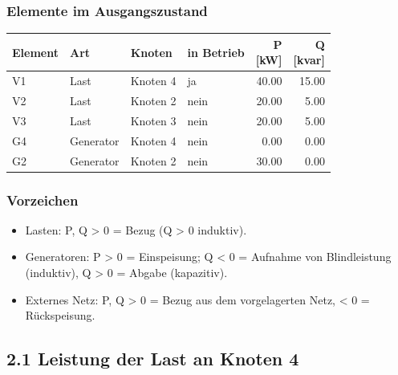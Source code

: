 \documentclass[11pt,a4paper]{article}
\begin{document}
\subsubsection{Elemente im Ausgangszustand}

\begin{table}[H]
\centering
\begin{adjustbox}{max width=\linewidth}
\begin{tabular}{llllrr}
\toprule
\textbf{Element} & \textbf{Art} & \textbf{Knoten} & \textbf{in Betrieb} & \thead{P \\ {[kW]}} & \thead{Q \\ {[kvar]}} \\
\midrule
V1 & Last & Knoten 4 & ja & 40.00 & 15.00 \\
V2 & Last & Knoten 2 & nein & 20.00 & 5.00 \\
V3 & Last & Knoten 3 & nein & 20.00 & 5.00 \\
G4 & Generator & Knoten 4 & nein & 0.00 & 0.00 \\
G2 & Generator & Knoten 2 & nein & 30.00 & 0.00 \\
\bottomrule
\end{tabular}
\end{adjustbox}
\end{table}

\subsubsection{Vorzeichen}

\begin{itemize}
\item Lasten: P, Q > 0 = Bezug (Q > 0 induktiv).
\item Generatoren: P > 0 = Einspeisung; Q < 0 = Aufnahme von Blindleistung (induktiv), Q > 0 = Abgabe (kapazitiv).
\item Externes Netz: P, Q > 0 = Bezug aus dem vorgelagerten Netz, < 0 = Rückspeisung.
\end{itemize}

\subsection{2.1 Leistung der Last an Knoten 4}
\end{document}
